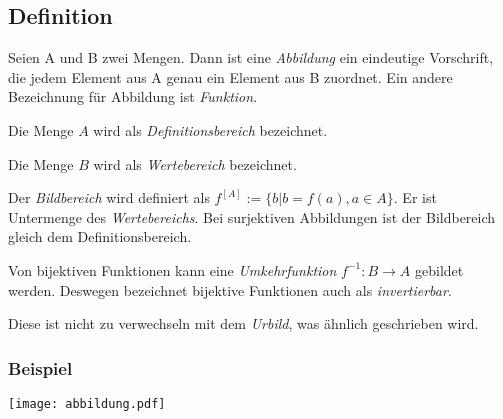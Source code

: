 \subsection{Definition}
Seien A und B zwei Mengen.
Dann ist eine \emph{Abbildung} ein eindeutige Vorschrift, die jedem Element aus A genau ein Element aus B zuordnet.
Ein andere Bezeichnung für Abbildung ist \emph{Funktion}.

Die Menge $A$ wird als \emph{Definitionsbereich} bezeichnet.

Die Menge $B$ wird als \emph{Wertebereich} bezeichnet.

Der \emph{Bildbereich} wird definiert als
$ f^{ [A] }:=\{b | b=f(a) , a \in A \}$.
Er ist Untermenge des \emph{Wertebereichs}. Bei surjektiven Abbildungen
ist der Bildbereich gleich dem Definitionsbereich.

Von bijektiven Funktionen kann eine \emph{Umkehrfunktion} $f^{-1} :
{B}\rightarrow{A} $ gebildet werden. Deswegen bezeichnet bijektive
Funktionen auch als \emph{invertierbar}.

Diese ist nicht zu verwechseln mit dem \emph{Urbild}, was ähnlich geschrieben wird.

\subsubsection*{Beispiel}
\texttt{[image: abbildung.pdf]}
